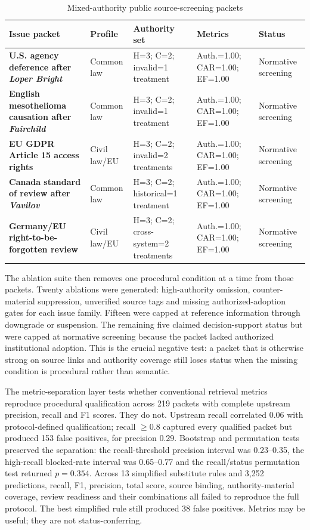 \documentclass[12pt,a4paper]{article}
\begin{document}
\begin{table}[htbp]
\centering
\caption{Mixed-authority public source-screening packets}
\label{tab:mixed-authority-source-screening}
\scriptsize
\renewcommand{\arraystretch}{1.1}
\begin{tabularx}{\textwidth}{>{\bfseries}Yp{1.8cm}p{2.3cm}p{2.0cm}p{1.8cm}}
\toprule
Issue packet & Profile & Authority set & Metrics & Status \\
\midrule
U.S. agency deference after \textit{Loper Bright} & Common law & H=3; C=2; invalid=1 treatment & Auth.=1.00; CAR=1.00; EF=1.00 & Normative screening \\
English mesothelioma causation after \textit{Fairchild} & Common law & H=3; C=2; invalid=1 treatment & Auth.=1.00; CAR=1.00; EF=1.00 & Normative screening \\
EU GDPR Article 15 access rights & Civil law/EU & H=3; C=2; invalid=2 treatments & Auth.=1.00; CAR=1.00; EF=1.00 & Normative screening \\
Canada standard of review after \textit{Vavilov} & Common law & H=3; C=2; historical=1 treatment & Auth.=1.00; CAR=1.00; EF=1.00 & Normative screening \\
Germany/EU right-to-be-forgotten review & Civil law/EU & H=3; C=2; cross-system=2 treatments & Auth.=1.00; CAR=1.00; EF=1.00 & Normative screening \\
\bottomrule
\end{tabularx}
\end{table}

The ablation suite then removes one procedural condition at a time from those packets. Twenty ablations were generated: high-authority omission, counter-material suppression, unverified source tags and missing authorized-adoption gates for each issue family. Fifteen were capped at reference information through downgrade or suspension. The remaining five claimed decision-support status but were capped at normative screening because the packet lacked authorized institutional adoption. This is the crucial negative test: a packet that is otherwise strong on source links and authority coverage still loses status when the missing condition is procedural rather than semantic.

The metric-separation layer tests whether conventional retrieval metrics reproduce procedural qualification across 219 packets with complete upstream precision, recall and F1 scores. They do not. Upstream recall correlated 0.06 with protocol-defined qualification; recall $\geq 0.8$ captured every qualified packet but produced 153 false positives, for precision 0.29. Bootstrap and permutation tests preserved the separation: the recall-threshold precision interval was 0.23--0.35, the high-recall blocked-rate interval was 0.65--0.77 and the recall/status permutation test returned $p=0.354$. Across 13 simplified substitute rules and 3,252 predictions, recall, F1, precision, total score, source binding, authority-material coverage, review readiness and their combinations all failed to reproduce the full protocol. The best simplified rule still produced 38 false positives. Metrics may be useful; they are not status-conferring.
\end{document}
